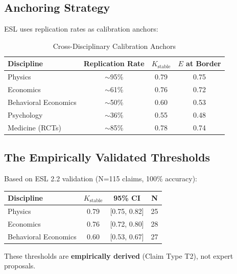 \documentclass[11pt,a4paper]{article}
\theoremstyle{remark}
\begin{document}
\subsection{Anchoring Strategy}

ESL uses replication rates as calibration anchors:

\begin{table}[h]
\centering
\caption{Cross-Disciplinary Calibration Anchors}
\label{tab:calibration-anchors}
\begin{tabular}{lccc}
\toprule
\textbf{Discipline} & \textbf{Replication Rate} & \textbf{$K_{\text{stable}}$} & \textbf{$E$ at Border} \\
\midrule
Physics & $\sim$95\% & 0.79 & 0.75 \\
Economics & $\sim$61\% & 0.76 & 0.72 \\
Behavioral Economics & $\sim$50\% & 0.60 & 0.53 \\
Psychology & $\sim$36\% & 0.55 & 0.48 \\
Medicine (RCTs) & $\sim$85\% & 0.78 & 0.74 \\
\bottomrule
\end{tabular}
\end{table}

\subsection{The Empirically Validated Thresholds}

Based on ESL 2.2 validation (N=115 claims, 100\% accuracy):

\begin{keyinsight}[title={Empirically Validated K-Thresholds}]
\begin{center}
\begin{tabular}{lccc}
\toprule
\textbf{Discipline} & $K_{\text{stable}}$ & \textbf{95\% CI} & \textbf{N} \\
\midrule
Physics & 0.79 & [0.75, 0.82] & 25 \\
Economics & 0.76 & [0.72, 0.80] & 28 \\
Behavioral Economics & 0.60 & [0.53, 0.67] & 27 \\
\bottomrule
\end{tabular}
\end{center}

These thresholds are \textbf{empirically derived} (Claim Type T2), not expert proposals.
\end{keyinsight}

\end{document}

